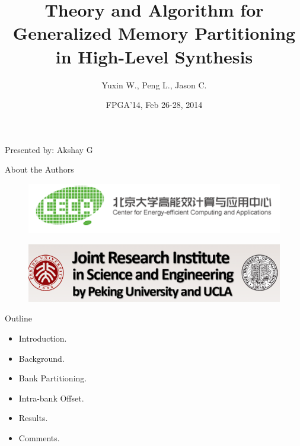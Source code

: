 \documentclass[xcolor=dvipsnames]{beamer}
\title{Theory and Algorithm for Generalized Memory Partitioning in High-Level Synthesis}
\subtitle{Yuxin W., Peng L., Jason C.}
\author{FPGA'14, Feb 26-28, 2014}
\begin{document}
    
    \begin{frame}

        \maketitle

        \begin{center}
            Presented by: Akshay G
        \end{center}

    \end{frame}

    \begin{frame}{About the Authors}

        \begin{figure}
            \includegraphics[scale=0.6]{CECA.PNG}
        \end{figure}

        \begin{figure}
            \includegraphics[scale=0.6]{PKU-UCLA.PNG}
        \end{figure}
        
    \end{frame}

    \begin{frame}{Outline}

        \begin{itemize}
            \item Introduction. 
            \item Background. 
            \item Bank Partitioning.
            \item Intra-bank Offset.
            \item Results. 
            \item Comments. 
        \end{itemize}
        
    \end{frame}
\end{document}
